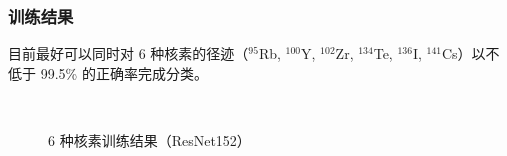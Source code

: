 \documentclass[AutoFakeBold]{LZUThesis}
\begin{document}
\subsubsection{训练结果}

目前最好可以同时对 6 种核素的径迹（$^{95}$Rb, $^{100}$Y, $^{102}$Zr, $^{134}$Te, $^{136}$I, $^{141}$Cs）以不低于 99.5\% 的正确率完成分类。

\begin{figure}[H]
	\centering
	\\	
    \caption{6 种核素训练结果（ResNet152）}
    \label{fig_learn6_resnet152}
\end{figure}
\end{document}
